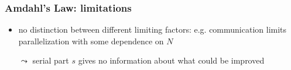 \documentclass[aspectratio=169]{beamer}
\begin{document}



\begin{frame}
	\frametitle{Amdahl's Law: limitations}

	\begin{itemize}
		\item no distinction between different limiting factors: e.g. communication limits parallelization with some dependence on \(N\)
		\item[\(\leadsto\)] serial part \(s\) gives no information about what could be improved
	\end{itemize}

\end{frame}
\end{document}
